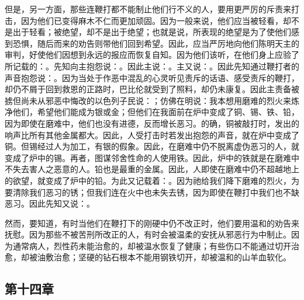 但是，另一方面，那些连鞭打都不能制止他们行不义的人，要用更严厉的斥责来打击，因为他们已变得麻木不仁而更加顽固。因为一般来说，他们应当被轻看，却不是出于轻看；被绝望，却不是出于绝望；也就是说，所表现的绝望是为了使他们感到恐惧，随后而来的劝告则带他们回到希望。因此，应当严厉地向他们陈明天主的审判，好使他们因想到永远的报应而恢复自知。因为他们该听，在他们身上应验了所记载的：。先知向主抱怨说：。因此主说：。主又说：。因此先知通过鞭打者的声音抱怨说：。因为当处于作恶中混乱的心灵听见责斥的话语、感受责斥的鞭打，却仍不屑于回到救恩的正路时，巴比伦就受到了照料，却仍未康复。因此主责备被掳但尚未从邪恶中悔改的以色列子民说：；仿佛在明说：我本想用磨难的烈火来炼净他们，希望他们能成为银或金；但他们在我面前在炉中变成了铜、锡、铁、铅，因为即使在磨难中，他们也没有进德，反而增长恶习。的确，铜被敲打时，发出的响声比所有其他金属都大。因此，人受打击时若发出抱怨的声音，就在炉中变成了铜。但锡经过人为加工，有银的假象。因此，在磨难中仍不脱离虚伪恶习的人，就变成了炉中的锡。再者，图谋邻舍性命的人使用铁。因此，炉中的铁就是在磨难中不失去害人之恶意的人。铅也是最重的金属。因此，人即使在磨难中仍不超越地上的欲望，就变成了炉中的铅。为此又记载着：。因为祂给我们降下磨难的烈火，为要清除我们恶习的锈；但我们连在火中也未失去锈，因为即使在鞭打中我们也不缺恶习。因此先知又说：。\par

然而，要知道，有时当他们在鞭打下的刚硬中仍不改正时，他们要用温和的劝告来抚慰。因为那些不被苦刑所改正的人，有时会被温柔的安抚从邪恶行为中制止。因为通常病人，烈性药未能治愈的，却被温水恢复了健康；有些伤口不能通过切开治愈，却被油敷治愈；坚硬的钻石根本不能用钢铁切开，却被温和的山羊血软化。\par


\subsection{第十四章}

